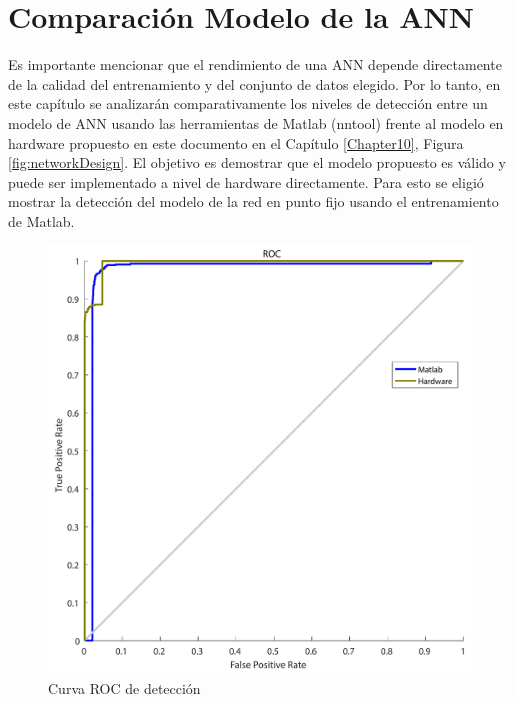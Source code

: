 
\chapter{Comparación Modelo de la ANN} %
\label{Chapter12}


Es importante mencionar que el rendimiento de una ANN depende directamente de la calidad del entrenamiento y del conjunto de datos elegido. Por lo tanto, en este capítulo se analizarán comparativamente los niveles de detección entre un modelo de ANN usando las herramientas de Matlab (nntool) frente al modelo en hardware propuesto en este documento en el Capítulo \ref{Chapter10}, Figura \ref{fig:networkDesign}. El objetivo es demostrar que el modelo propuesto es válido y puede ser implementado a nivel de hardware directamente. Para esto se eligió mostrar la detección del modelo de la red en punto fijo usando el entrenamiento de Matlab.

\begin{figure}[!ht]
	\centering
		\includegraphics[scale=0.35]{./Figures/ROCANN}
	\caption{Curva ROC de detección}
	\label{fig:ROC}
\end{figure}

